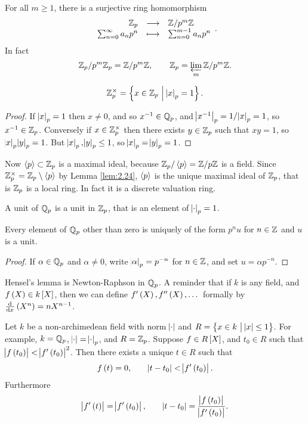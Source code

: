\pagebreak

For all $ m \ge 1 $, there is a surjective ring homomorphism
$$ \function{\ZZ_p}{\ZZ / p^m\ZZ}{\sum_{n = 0}^\infty a_np^n}{\sum_{n = 0}^{m - 1} a_np^n}. $$
In fact
$$ \mathbb{Z}_p / p^m\mathbb{Z}_p = \mathbb{Z} / p^m\mathbb{Z}, \qquad \mathbb{Z}_p = \varprojlim_m \mathbb{Z} / p^m\mathbb{Z}. $$

\begin{lemma}
\label{lem:2.24}
$$ \ZZ_p^\times = \cbr{x \in \ZZ_p \st \abs{x}_p = 1}. $$
\end{lemma}

\begin{proof}
If $ \abs{x}_p = 1 $ then $ x \ne 0 $, and so $ x^{-1} \in \mathbb{Q}_p $, and $ \abs{x^{-1}}_p = 1 / \abs{x}_p = 1 $, so $ x^{-1} \in \mathbb{Z}_p $. Conversely if $ x \in \mathbb{Z}_p^\times $ then there exists $ y \in \mathbb{Z}_p $ such that $ xy = 1 $, so $ \abs{x}_p\abs{y}_p = 1 $. But $ \abs{x}_p, \abs{y}_p \le 1 $, so $ \abs{x}_p = \abs{y}_p = 1 $.
\end{proof}

Now $ \left\langle p \right\rangle \subset \mathbb{Z}_p $ is a maximal ideal, because $ \mathbb{Z}_p / \left\langle p \right\rangle = \mathbb{Z} / p\mathbb{Z} $ is a field. Since $ \mathbb{Z}_p^\times = \mathbb{Z}_p \setminus \left\langle p \right\rangle $ by Lemma \ref{lem:2.24}, $ \left\langle p \right\rangle $ is the unique maximal ideal of $ \mathbb{Z}_p $, that is $ \mathbb{Z}_p $ is a local ring. In fact it is a discrete valuation ring.

\begin{notation*}
A unit of $ \mathbb{Q}_p $ is a unit in $ \mathbb{Z}_p $, that is an element of $ \abs{\cdot}_p = 1 $.
\end{notation*}

\begin{corollary}
Every element of $ \mathbb{Q}_p $ other than zero is uniquely of the form $ p^nu $ for $ n \in \mathbb{Z} $ and $ u $ is a unit.
\end{corollary}

\begin{proof}
If $ \alpha \in \mathbb{Q}_p $ and $ \alpha \ne 0 $, write $ \abs{\alpha}_p = p^{-n} $ for $ n \in \mathbb{Z} $, and set $ u = \alpha p^{-n} $.
\end{proof}

Hensel's lemma is Newton-Raphson in $ \mathbb{Q}_p $. A reminder that if $ k $ is any field, and $ f\br{X} \in k\sbr{X} $, then we can define $ f'\br{X}, f''\br{X}, \dots $ formally by $ \tod{}{x}\br{X^n} = nX^{n - 1} $.

\begin{theorem}
Let $ k $ be a non-archimedean field with norm $ \abs{\cdot} $ and $ R = \cbr{x \in k \st \abs{x} \le 1} $. For example, $ k = \mathbb{Q}_p $, $ \abs{\cdot} = \abs{\cdot}_p $, and $ R = \mathbb{Z}_p $. Suppose $ f \in R\sbr{X} $, and $ t_0 \in R $ such that $ \abs{f\br{t_0}} < \abs{f'\br{t_0}}^2 $. Then there exists a unique $ t \in R $ such that
$$ f\br{t} = 0, \qquad \abs{t - t_0} < \abs{f'\br{t_0}}. $$
Furthermore
$$ \abs{f'\br{t}} = \abs{f'\br{t_0}}, \qquad \abs{t - t_0} = \dfrac{\abs{f\br{t_0}}}{\abs{f'\br{t_0}}}. $$
\end{theorem}

